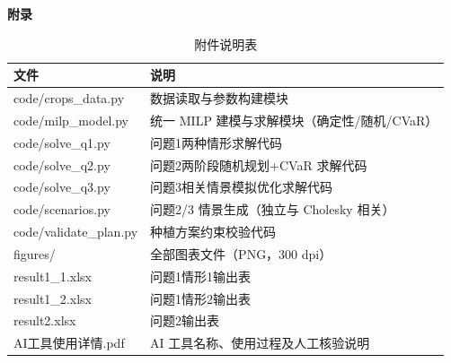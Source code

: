 \newpage
\appendix
\begin{center}
	{\bfseries 附录}
\end{center}

\begin{table}[htbp]
	\caption{附件说明表}
	\centering
	\begin{tabularx}{0.9\textwidth}{lX}
		\toprule
		文件 & 说明 \\
		\midrule
		code/crops\_data.py & 数据读取与参数构建模块 \\
		code/milp\_model.py & 统一 MILP 建模与求解模块（确定性/随机/CVaR） \\
		code/solve\_q1.py & 问题1两种情形求解代码 \\
		code/solve\_q2.py & 问题2两阶段随机规划+CVaR 求解代码 \\
		code/solve\_q3.py & 问题3相关情景模拟优化求解代码 \\
		code/scenarios.py & 问题2/3 情景生成（独立与 Cholesky 相关） \\
		code/validate\_plan.py & 种植方案约束校验代码 \\
		figures/ & 全部图表文件（PNG，300 dpi） \\
		result1\_1.xlsx & 问题1情形1输出表 \\
		result1\_2.xlsx & 问题1情形2输出表 \\
		result2.xlsx & 问题2输出表 \\
		AI工具使用详情.pdf & AI 工具名称、使用过程及人工核验说明 \\
		\bottomrule
	\end{tabularx}
\end{table}
